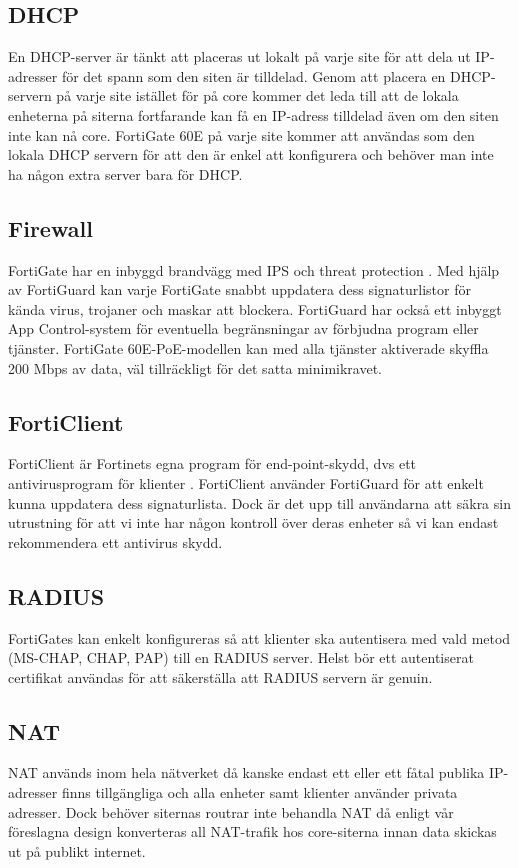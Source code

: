 \subsection{DHCP}
    En DHCP-server är tänkt att placeras ut lokalt på varje site för att dela ut IP-adresser för det spann som den siten är tilldelad. Genom att placera en DHCP-servern på varje site istället för på core kommer det leda till att de lokala enheterna på siterna fortfarande kan få en IP-adress tilldelad även om den siten inte kan nå core. FortiGate 60E på varje site kommer att användas som den lokala DHCP servern för att den är enkel att konfigurera och behöver man inte ha någon extra server bara för DHCP.

\newpage
\subsection{Firewall}
    FortiGate har en inbyggd brandvägg med IPS och threat protection \cite{FN_FortiGate-60E}. Med hjälp av FortiGuard kan varje FortiGate snabbt uppdatera dess signaturlistor för kända virus, trojaner och maskar att blockera. FortiGuard har också ett inbyggt App Control-system för eventuella begränsningar av förbjudna program eller tjänster. FortiGate 60E-PoE-modellen kan med alla tjänster aktiverade skyffla 200 Mbps av data, väl tillräckligt för det satta minimikravet.

\subsection{FortiClient}
    FortiClient är Fortinets egna program för end-point-skydd, dvs ett antivirusprogram för klienter \cite{FN_FortiClient}. FortiClient använder FortiGuard för att enkelt kunna uppdatera dess signaturlista. Dock är det upp till användarna att säkra sin utrustning för att vi inte har någon kontroll över deras enheter så vi kan endast rekommendera ett antivirus skydd.

\subsection{RADIUS}
    FortiGates kan enkelt konfigureras så att klienter ska autentisera med vald metod (MS-CHAP, CHAP, PAP) till en RADIUS server. Helst bör ett autentiserat certifikat användas för att säkerställa att RADIUS servern är genuin.

\subsection{NAT}
    NAT används inom hela nätverket då kanske endast ett eller ett fåtal publika IP-adresser finns tillgängliga och alla enheter samt klienter använder privata adresser. Dock behöver siternas routrar inte behandla NAT då enligt vår föreslagna design konverteras all NAT-trafik hos core-siterna innan data skickas ut på publikt internet.
